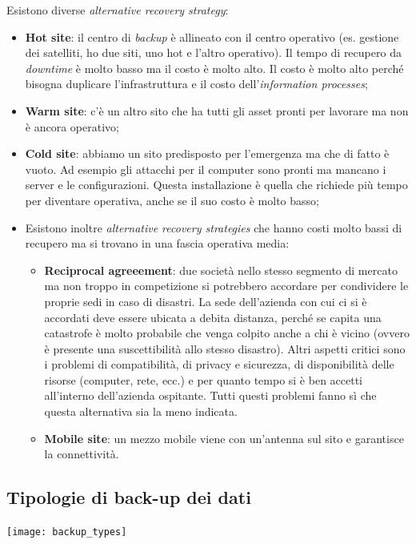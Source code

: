Esistono diverse \textit{alternative recovery strategy}:
\begin{itemize}
  \item \textbf{Hot site}: il centro di \textit{backup} è allineato con il
  centro operativo (es. gestione dei satelliti, ho due siti, uno hot e l'altro
  operativo). Il tempo di recupero da \textit{downtime} è molto basso ma il
  costo è molto alto. Il costo è molto alto perché bisogna duplicare
  l'infrastruttura e il costo dell'\textit{information processes};
  \item \textbf{Warm site}: c'è un altro sito che ha tutti gli asset pronti
  per lavorare ma non è ancora operativo;
  \item \textbf{Cold site}: abbiamo un sito predisposto per l'emergenza ma che
  di fatto è vuoto. Ad esempio gli attacchi per il computer sono pronti ma
  mancano i server e le configurazioni. Questa installazione è quella che
  richiede più tempo per diventare operativa, anche se il suo costo è molto
  basso;
  \item Esistono inoltre \textit{alternative recovery strategies} che hanno
  costi molto bassi di recupero ma si trovano in una fascia operativa media:
  \begin{itemize}
  \item \textbf{Reciprocal agreeement}: due società nello
  stesso segmento di mercato ma non troppo in competizione si potrebbero
  accordare per condividere le proprie sedi in caso di disastri. 
  La sede dell'azienda con cui ci si è accordati deve essere ubicata a
  debita distanza, perché se capita una catastrofe è molto probabile che venga
  colpito anche a chi è vicino (ovvero è presente una suscettibilità 
  allo stesso disastro). Altri aspetti critici sono i problemi di 
  compatibilità, di privacy e sicurezza, di disponibilità delle risorse
  (computer, rete, ecc.) e per quanto tempo si è ben accetti all'interno
  dell'azienda ospitante.
  Tutti questi problemi fanno sì che questa
  alternativa sia la meno indicata.
  \item \textbf{Mobile site}: un mezzo mobile viene con un'antenna sul sito e
  garantisce la connettività.
  \end{itemize}
\end{itemize}

\subsection{Tipologie di back-up dei dati}

\begin{center}
\centering
  \texttt{[image: backup\_types]}
  \label{fig:data_backup_types}
\end{center}

